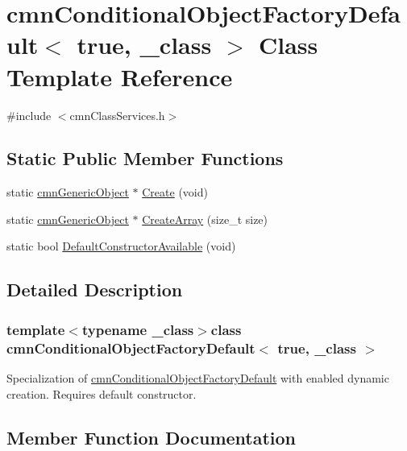 \hypertarget{classcmn_conditional_object_factory_default_3_01true_00_01__class_01_4}{}\section{cmn\+Conditional\+Object\+Factory\+Default$<$ true, \+\_\+class $>$ Class Template Reference}
\label{classcmn_conditional_object_factory_default_3_01true_00_01__class_01_4}


{\ttfamily \#include $<$cmn\+Class\+Services.\+h$>$}

\subsection*{Static Public Member Functions}
\begin{DoxyCompactItemize}
\item 
static \hyperlink{classcmn_generic_object}{cmn\+Generic\+Object} $\ast$ \hyperlink{classcmn_conditional_object_factory_default_3_01true_00_01__class_01_4_ad41c2a658391f398de6d261b562206ef}{Create} (void)
\item 
static \hyperlink{classcmn_generic_object}{cmn\+Generic\+Object} $\ast$ \hyperlink{classcmn_conditional_object_factory_default_3_01true_00_01__class_01_4_af3901746f7aaf60dd183e9a0e7d8875c}{Create\+Array} (size\+\_\+t size)
\item 
static bool \hyperlink{classcmn_conditional_object_factory_default_3_01true_00_01__class_01_4_a02f6196021e94e87afe2ea88b77cb4ce}{Default\+Constructor\+Available} (void)
\end{DoxyCompactItemize}


\subsection{Detailed Description}
\subsubsection*{template$<$typename \+\_\+class$>$class cmn\+Conditional\+Object\+Factory\+Default$<$ true, \+\_\+class $>$}

Specialization of \hyperlink{classcmn_conditional_object_factory_default}{cmn\+Conditional\+Object\+Factory\+Default} with enabled dynamic creation. Requires default constructor. 

\subsection{Member Function Documentation}
\hypertarget{classcmn_conditional_object_factory_default_3_01true_00_01__class_01_4_ad41c2a658391f398de6d261b562206ef}{}

